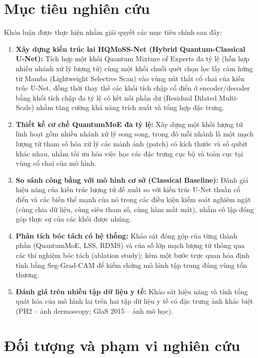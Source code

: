 \section{Mục tiêu nghiên cứu}
Khóa luận được thực hiện nhằm giải quyết các mục tiêu chính sau đây:
\begin{enumerate}
    \item \textbf{Xây dựng kiến trúc lai HQMoSS-Net (Hybrid Quantum-Classical U-Net):} Tích hợp một khối Quantum Mixture of Experts đa tỷ lệ (hỗn hợp nhiều nhánh xử lý lượng tử) cùng một khối chuỗi quét chọn lọc lấy cảm hứng từ Mamba (Lightweight Selective Scan) vào vùng nút thắt cổ chai của kiến trúc U-Net, đồng thời thay thế các khối tích chập cổ điển ở encoder/decoder bằng khối tích chập đa tỷ lệ có kết nối phần dư (Residual Dilated Multi-Scale) nhằm tăng cường khả năng trích xuất và tổng hợp đặc trưng.
    \item \textbf{Thiết kế cơ chế QuantumMoE đa tỷ lệ:} Xây dựng một khối lượng tử linh hoạt gồm nhiều nhánh xử lý song song, trong đó mỗi nhánh là một mạch lượng tử tham số hóa xử lý các mảnh ảnh (patch) có kích thước và số qubit khác nhau, nhằm tối ưu hóa việc học các đặc trưng cục bộ và toàn cục tại vùng cổ chai của mô hình.
    \item \textbf{So sánh công bằng với mô hình cơ sở (Classical Baseline):} Đánh giá hiệu năng của kiến trúc lượng tử đề xuất so với kiến trúc U-Net thuần cổ điển và các biến thể mạnh của nó trong các điều kiện kiểm soát nghiêm ngặt (cùng chia dữ liệu, cùng siêu tham số, cùng hàm mất mát), nhằm cô lập đóng góp thực sự của các khối được nhúng.
    \item \textbf{Phân tích bóc tách có hệ thống:} Khảo sát đóng góp của từng thành phần (QuantumMoE, LSS, RDMS) và của số lớp mạch lượng tử thông qua các thí nghiệm bóc tách (ablation study); kèm một bước trực quan hóa định tính bằng Seg-Grad-CAM để kiểm chứng mô hình tập trung đúng vùng tổn thương.
    \item \textbf{Đánh giá trên nhiều tập dữ liệu y tế:} Khảo sát hiệu năng và tính tổng quát hóa của mô hình lai trên hai tập dữ liệu y tế có đặc trưng ảnh khác biệt (PH2 -- ảnh dermoscopy; GlaS 2015 -- ảnh mô học).
\end{enumerate}

\section{Đối tượng và phạm vi nghiên cứu}
